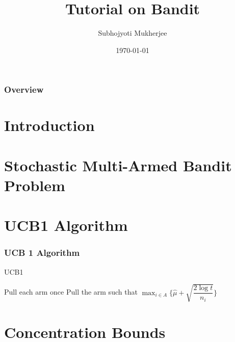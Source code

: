 \documentclass{beamer}
\title[Tutorial on Bandit]{Tutorial on Bandit} %
\author{Subhojyoti Mukherjee} %
\institute[IIT Madras] %
{
IIT Madras \\ %
\medskip
}
\date{\today} %
\begin{document}
\nocite{*}
\begin{frame}
\titlepage %
\end{frame}

\begin{frame}
\frametitle{Overview} %
\tableofcontents %
\end{frame}



\section{Introduction}


\section{Stochastic Multi-Armed Bandit Problem}


\section{UCB1 Algorithm}
\begin{frame}
\frametitle{UCB 1 Algorithm}
\begin{algorithm}[H]
\caption{UCB1}
\begin{algorithmic}[1]
\State Pull each arm once
\State Pull the arm such that $\max_{i\in A}\bigg\lbrace\hat{\mu} + \sqrt{\dfrac{2\log t}{n_i}}\bigg\rbrace$
 \EndFor
\end{algorithmic}
\end{algorithm}
\cite{auer2002finite}
\end{frame}

\section{Concentration Bounds}

\end{document}
